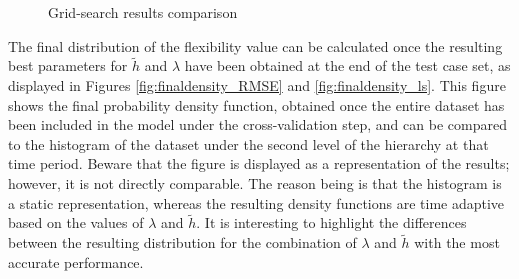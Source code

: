 
%


\begin{figure}[htbp]
\centering     %
{}
\caption{Grid-search results comparison}
\label{fig:onlinekde_rmse}
\end{figure}


The final distribution of the flexibility value can be calculated once the resulting best parameters for $\widetilde{h}$ and $\lambda$ have been obtained at the end of the test case set, as displayed in Figures \ref{fig:finaldensity_RMSE} and \ref{fig:finaldensity_ls}. This figure shows the final probability density function, obtained once the entire dataset has been included in the model under the cross-validation step, and can be compared to the histogram of the dataset under the second level of the hierarchy at that time period. Beware that the figure is displayed as a representation of the results; however, it is not directly comparable. The reason being is that the histogram is a static representation, whereas the resulting density functions are time adaptive based on the values of $\lambda$ and $\widetilde{h}$. It is interesting to highlight the differences between the resulting distribution for the combination of $\lambda$ and $\widetilde{h}$ with the most accurate performance.

